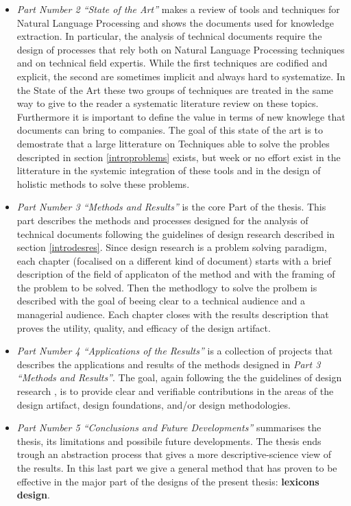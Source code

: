 \documentclass[]{book}
\begin{document}
\begin{itemize}
\item
  \emph{Part Number 2 ``State of the Art''} makes a review of tools and
  techniques for Natural Language Processing and shows the documents
  used for knowledge extraction. In particular, the analysis of
  technical documents require the design of processes that rely both on
  Natural Language Processing techniques and on technical field
  expertis. While the first techniques are codified and explicit, the
  second are sometimes implicit and always hard to systematize. In the
  State of the Art these two groups of techniques are treated in the
  same way to give to the reader a systematic literature review on these
  topics. Furthermore it is important to define the value in terms of
  new knowlege that documents can bring to companies. The goal of this
  state of the art is to demostrate that a large litterature on
  Techniques able to solve the probles descripted in section
  \ref{introproblems} exists, but week or no effort exist in the
  litterature in the systemic integration of these tools and in the
  design of holistic methods to solve these problems.
\item
  \emph{Part Number 3 ``Methods and Results''} is the core Part of the
  thesis. This part describes the methods and processes designed for the
  analysis of technical documents following the guidelines of design
  research described in section \ref{introdesres}. Since design research
  is a problem solving paradigm, each chapter (focalised on a different
  kind of document) starts with a brief description of the field of
  applicaton of the method and with the framing of the problem to be
  solved. Then the methodlogy to solve the prolbem is described with the
  goal of beeing clear to a technical audience and a managerial
  audience. Each chapter closes with the results description that proves
  the utility, quality, and efficacy of the design artifact.
\item
  \emph{Part Number 4 ``Applications of the Results''} is a collection
  of projects that describes the applications and results of the methods
  designed in \emph{Part 3 ``Methods and Results''}. The goal, again
  following the the guidelines of design research
  \citep{bichler2006design}, is to provide clear and verifiable
  contributions in the areas of the design artifact, design foundations,
  and/or design methodologies.
\item
  \emph{Part Number 5 ``Conclusions and Future Developments''}
  summarises the thesis, its limitations and possibile future
  developments. The thesis ends trough an abstraction process that gives
  a more descriptive-science view of the results. In this last part we
  give a general method that has proven to be effective in the major
  part of the designs of the present thesis: \textbf{lexicons design}.
\end{itemize}
\end{document}
